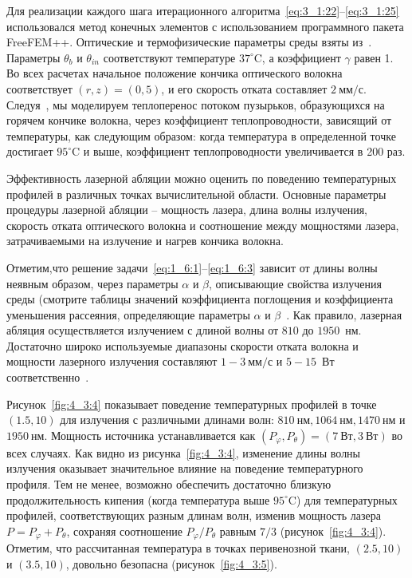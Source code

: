 Для реализации каждого шага итерационного
алгоритма~\eqref{eq:3_1:22}--\eqref{eq:3_1:25}
использовался метод конечных элементов с использованием
программного пакета FreeFEM++\cite{Hecht2012}.
Оптические и термофизические параметры среды
взяты из~\cite{Opticalthermal_vanRuijven2014}.
Параметры $\theta_{b}$ и $\theta_{i n}$ соответствуют
температуре $37^{\circ} \mathrm{C}$, а коэффициент $\gamma$ равен 1.
Во всех расчетах начальное положение кончика оптического волокна
соответствует $(r, z)=(0,5)$, и его скорость отката составляет
$2 \mathrm{~мм} / \mathrm{с}$.
Следуя~\cite{van2014optical, Some_Poluektova2014},
мы моделируем теплоперенос потоком пузырьков,
образующихся на горячем кончике волокна, через коэффициент теплопроводности,
зависящий от температуры, как следующим образом: когда температура
в определенной точке достигает $95^{\circ} \mathrm{C}$ и выше,
коэффициент теплопроводности увеличивается в 200 раз.

Эффективность лазерной абляции можно оценить по поведению
температурных профилей в различных точках вычислительной области.
Основные параметры процедуры лазерной абляции -- мощность лазера,
длина волны излучения, скорость отката оптического волокна и
соотношение между мощностями лазера, затрачиваемыми на
излучение и нагрев кончика волокна.

Отметим,что решение задачи~\eqref{eq:1_6:1}--\eqref{eq:1_6:3} зависит от длины
волны неявным образом, через параметры $\alpha$ и $\beta$,
описывающие свойства излучения среды (смотрите таблицы значений коэффициента
поглощения и коэффициента уменьшения рассеяния, определяющие параметры
$\alpha$ и $\beta$~\cite{Opticalthermal_vanRuijven2014, Some_Poluektova2014}.
Как правило, лазерная абляция осуществляется излучением с длиной волны
от \(810\) до $1950$~нм.
Достаточно широко используемые диапазоны скорости отката волокна и мощности
лазерного излучения составляют $1-3 \mathrm{~мм} / \mathrm{с}$
и $5-15$~Вт
соответственно~\cite{
    Mathematical_Mordon2006,
    Opticalthermal_vanRuijven2014,
    Some_Poluektova2014}.

Рисунок~\ref{fig:4_3:4} показывает поведение температурных профилей в точке $(1.5,10)$ для
излучения с различными длинами волн: $810 \mathrm{~нм}, 1064 \mathrm{~нм},
1470 \mathrm{~нм}$ и $1950 \mathrm{~нм}$.
Мощность источника устанавливается как $\left(P_{\varphi}, P_{\theta}\right)
=(7 \mathrm{~Вт}, 3 \mathrm{~Вт})$ во всех случаях.
Как видно из рисунка~\ref{fig:4_3:4}, изменение длины волны излучения оказывает
значительное влияние на поведение температурного профиля.
Тем не менее, возможно обеспечить достаточно близкую продолжительность
кипения (когда температура выше $95^{\circ} \mathrm{C}$) для температурных
профилей, соответствующих разным длинам волн, изменив мощность
лазера $P=P_{\varphi}+P_{\theta}$, сохраняя соотношение
$P_{\varphi} / P_{\theta}$ равным $7 / 3$ (рисунок~\ref{fig:4_3:4}).
Отметим, что рассчитанная температура в точках перивенозной ткани,
$(2.5,10)$ и $(3.5,10)$, довольно безопасна (рисунок~\ref{fig:4_3:5}).

